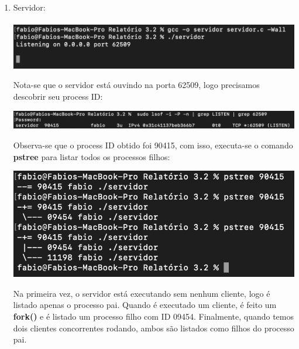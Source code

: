 \documentclass[12pt,a4paper]{report}
\begin{document}
\begin{enumerate}
    \item Servidor:\\\\
    \includegraphics[width=13cm]{images/ex6-servidor-execucao.png}
    
    Nota-se que o servidor está ouvindo na porta 62509, logo precisamos descobrir seu process ID:
    
    \includegraphics[width=13cm]{images/ex6-servidor-ppid.png}
    
    Observa-se que o process ID obtido foi 90415, com isso, executa-se o comando \textbf{pstree} para listar todos os processos filhos:
    
    \includegraphics[width=13cm]{images/ex6-servidor-pstree.png}
    
    Na primeira vez, o servidor está executando sem nenhum cliente, logo é listado apenas o processo pai. Quando é executado um cliente, é feito um \textbf{fork()} e é listado um processo filho com ID 09454. Finalmente, quando temos dois clientes concorrentes rodando, ambos são listados como filhos do processo pai.
\end{enumerate}
\end{document}
